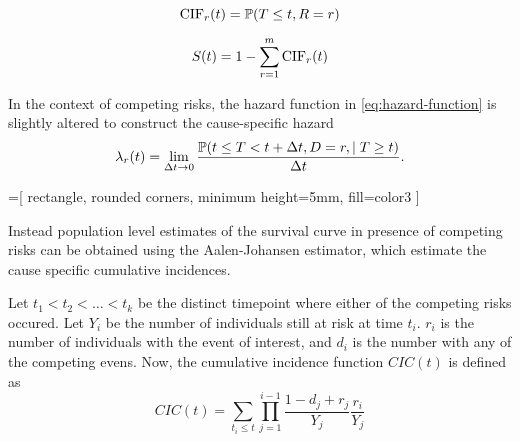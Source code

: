 \begin{equation}
    \operatorname{CIF}_r(t) = \operatorname{\mathbb{P}} (T \leq t, R = r)
\end{equation}

\begin{equation} 
    S(t) = 1 - \sum_{r = 1}^{m} \operatorname{CIF}_r(t)
\end{equation}

In the context of competing risks, 
the hazard function in 
\cref{eq:hazard-function}
is slightly altered to construct
the cause-specific hazard
\begin{equation}
    \label{eq:cause-hazard}
    \lambda_r(t) = \lim_{\Delta t \to 0} 
        \frac{\PR (t \leq T < t + \Delta t, D = r, \mid T \geq t)}{\Delta t}.
\end{equation}

\begin{marginfigure}
    =[%
        rectangle, rounded corners, minimum height=5mm, fill=color3
    ]
    \centering
\end{marginfigure}











Instead population level estimates of the survival curve in presence of competing 
risks can be obtained using the Aalen-Johansen estimator,
which estimate the cause specific cumulative incidences.



Let \(t_1 < t_2 < \ldots < t_k\) be the distinct timepoint where 
either of the competing risks occured.
Let \(Y_i\) be the number of individuals still at risk at time \(t_i\).
\(r_i\) is the number of individuals with the event of interest, 
and \(d_i\) is the number with any of the competing evens.
Now, the cumulative incidence function \(CIC(t)\) is defined as
\begin{equation}
    CIC(t) = \sum_{t_i \leq t} \prod_{j = 1}^{i - 1} 
    \frac{1 - d_j + r_j}{Y_j} \frac{r_i}{Y_j}
\end{equation}

